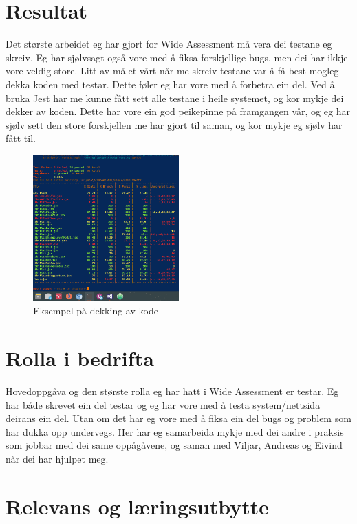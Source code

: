\documentclass[12pt]{article}
\begin{document}
\section{Resultat}

Det største arbeidet eg har gjort for Wide Assessment må vera dei testane eg skreiv.
Eg har sjølvsagt også vore med å fiksa forskjellige bugs, men dei har ikkje vore
veldig store. Litt av målet vårt når me skreiv testane var å få best mogleg dekka
koden med testar. Dette føler eg har vore med å forbetra ein del. Ved å bruka
Jest har me kunne fått sett alle testane i heile systemet, og kor mykje dei dekker
av koden. Dette har vore ein god peikepinne på framgangen vår, og eg har sjølv sett
den store forskjellen me har gjort til saman, og kor mykje eg sjølv har fått til.

\begin{figure}[!h]
  \includegraphics[width=0.5\textwidth]{coverage}
  \centering
  \caption{Eksempel på dekking av kode}
  \label{fig:coverage1}
\end{figure}

\section{Rolla i bedrifta}

Hovedoppgåva og den største rolla eg har hatt i Wide Assessment er testar. Eg har
både skrevet ein del testar og eg har vore med å testa system/nettsida deirans ein
del. Utan om det har eg vore med å fiksa ein del bugs og problem som har dukka
opp undervegs. Her har eg samarbeida mykje med dei andre i praksis som jobbar med
dei same oppågåvene, og saman med Viljar, Andreas og Eivind når dei har hjulpet meg.


\section{Relevans og læringsutbytte}
\end{document}
